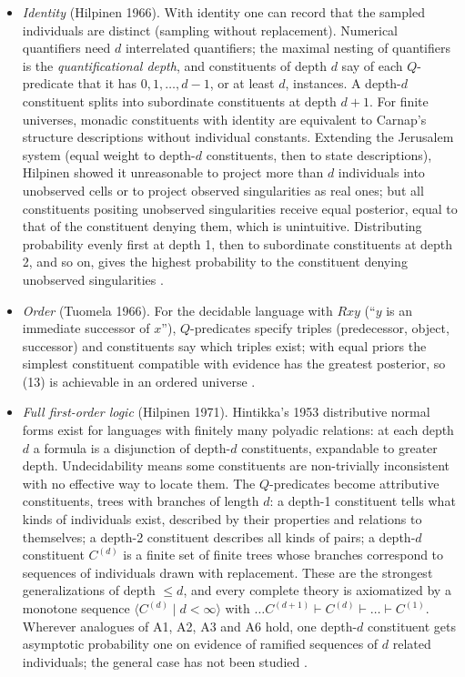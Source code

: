 \begin{itemize}
\item \emph{Identity} (Hilpinen 1966). With identity one can record that
  the sampled individuals are distinct (sampling without replacement).
  Numerical quantifiers need \(d\) interrelated quantifiers; the maximal
  nesting of quantifiers is the \emph{quantificational depth}, and
  constituents of depth \(d\) say of each \(Q\)-predicate that it has
  \(0,1,\ldots,d-1\), or at least \(d\), instances. A depth-\(d\)
  constituent splits into subordinate constituents at depth \(d+1\). For
  finite universes, monadic constituents with identity are equivalent to
  Carnap's structure descriptions without individual constants. Extending
  the Jerusalem system (equal weight to depth-\(d\) constituents, then to
  state descriptions), Hilpinen showed it unreasonable to project more
  than \(d\) individuals into unobserved cells or to project observed
  singularities as real ones; but all constituents positing unobserved
  singularities receive equal posterior, equal to that of the constituent
  denying them, which is unintuitive. Distributing probability evenly
  first at depth 1, then to subordinate constituents at depth 2, and so on,
  gives the highest probability to the constituent denying unobserved
  singularities \cite[p.~326]{Niiniluoto2011HintikkaProgramReading}.
\item \emph{Order} (Tuomela 1966). For the decidable language with
  \(Rxy\) (``\(y\) is an immediate successor of \(x\)''), \(Q\)-predicates
  specify triples (predecessor, object, successor) and constituents say
  which triples exist; with equal priors the simplest constituent
  compatible with evidence has the greatest posterior, so (13) is
  achievable in an ordered universe \cite[pp.~326--327]{Niiniluoto2011HintikkaProgramReading}.
\item \emph{Full first-order logic} (Hilpinen 1971). Hintikka's 1953
  distributive normal forms exist for languages with finitely many
  polyadic relations: at each depth \(d\) a formula is a disjunction of
  depth-\(d\) constituents, expandable to greater depth. Undecidability
  means some constituents are non-trivially inconsistent with no
  effective way to locate them. The \(Q\)-predicates become attributive
  constituents, trees with branches of length \(d\): a depth-1
  constituent tells what kinds of individuals exist, described by their
  properties and relations to themselves; a depth-2 constituent describes
  all kinds of pairs; a depth-\(d\) constituent \(C^{(d)}\) is a finite set
  of finite trees whose branches correspond to sequences of individuals
  drawn with replacement. These are the strongest generalizations of
  depth \(\leq d\), and every complete theory is axiomatized by a monotone
  sequence \(\langle C^{(d)}\mid d<\infty\rangle\) with
  \(\ldots C^{(d+1)}\vdash C^{(d)}\vdash\ldots\vdash C^{(1)}\). Wherever
  analogues of A1, A2, A3 and A6 hold, one depth-\(d\) constituent gets
  asymptotic probability one on evidence of ramified sequences of \(d\)
  related individuals; the general case has not been studied
  \cite[p.~327]{Niiniluoto2011HintikkaProgramReading}.
\end{itemize}
